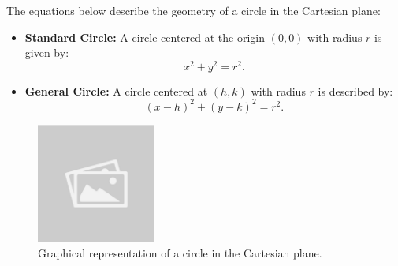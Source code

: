 \documentclass{article}
\begin{document}
\begin{theorembox}
    The equations below describe the geometry of a circle in the Cartesian plane:
    
    \begin{itemize}
        \item \textbf{Standard Circle:} A circle centered at the origin \((0, 0)\) with radius \(r\) is given by:
        \[
            x^2 + y^2 = r^2.
        \]
    
        \item \textbf{General Circle:} A circle centered at \((h, k)\) with radius \(r\) is described by:
        \[
            (x - h)^2 + (y - k)^2 = r^2.
        \]
    \end{itemize}
    
    \begin{figure}[H]
        \centering
        \includegraphics[width=0.35\textwidth]{sample_image1.jpg}
        \caption{Graphical representation of a circle in the Cartesian plane.}
        \label{fig:sample_image1}
    \end{figure}
\end{theorembox}
    
\end{document}
